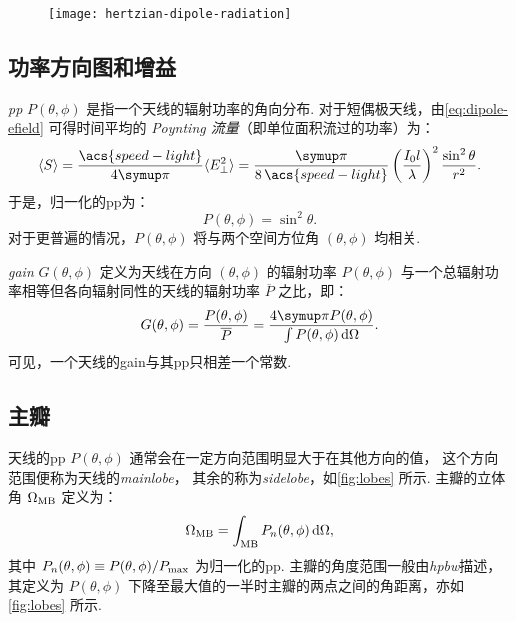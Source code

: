 \begin{figure}[htp]
  \centering
  \texttt{[image: hertzian-dipole-radiation]}
  \label{fig:dipole-radiation}
\end{figure}

\subsection{功率方向图和增益}

\emph{\acf{pp}} $P(\theta,\phi)$ 是指一个天线的辐射功率的角向分布.
对于短偶极天线，由\autoref{eq:dipole-efield} 可得时间平均的
\emph{Poynting 流量}（即单位面积流过的功率）为：
\begin{equation}
  \label{eq:poynting-flux}
  \langle S \rangle
    = \frac{\acs{speed-light}}{4\Cpi} \langle E_{\perp}^2 \rangle
    = \frac{\Cpi}{8\,\acs{speed-light}}
      \left( \frac{I_0 l}{\lambda} \right)^2 \frac{\sin^2\theta}{r^2} .
\end{equation}
于是，归一化的\ac{pp}为：
\begin{equation}
  \label{eq:power-pattern}
  P(\theta,\phi) = \sin^2\theta .
\end{equation}
对于更普遍的情况，$P(\theta,\phi)$ 将与两个空间方位角 $(\theta, \phi)$
均相关.

\emph{\acf{gain}} $G(\theta,\phi)$ 定义为天线在方向 $(\theta, \phi)$
的辐射功率 $P(\theta,\phi)$ 与一个总辐射功率相等但各向辐射同性的天线的辐射功率
$\overline{P}$ 之比，即：
\begin{equation}
  \label{eq:gain}
  G(\theta,\phi) = \frac{P(\theta,\phi)}{\overline{P}}
    = \frac{4\Cpi P(\theta,\phi)}{\int P(\theta,\phi) \,\D{\Omega}} .
\end{equation}
可见，一个天线的\ac{gain}与其\ac{pp}只相差一个常数.

\subsection{主瓣}

天线的\ac{pp} $P(\theta,\phi)$ 通常会在一定方向范围明显大于在其他方向的值，
这个方向范围便称为天线的\emph{\acf{mainlobe}}，
其余的称为\emph{\acf{sidelobe}}，如\autoref{fig:lobes} 所示.
主瓣的立体角 $\Omega_{\mathrm{MB}}$ 定义为：
\begin{equation}
  \label{eq:omega-mb}
  \Omega_{\mathrm{MB}} = \int_{\mathrm{MB}} P_n(\theta,\phi) \,\mathrm{d}\Omega ,
\end{equation}
其中 $P_n(\theta,\phi) \equiv P(\theta,\phi) / P_{\mathrm{max}}$
为归一化的\ac{pp}.
主瓣的角度范围一般由\emph{\acf{hpbw}}描述，其定义为 $P(\theta,\phi)$
下降至最大值的一半时主瓣的两点之间的角距离，亦如\autoref{fig:lobes} 所示.

